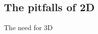 \begin{comment}
\subsubsection{Proximity Protocol}\label{sec:proximity2D}
We describe a protocol for ``proximity'' of a purported codeword to the
interleaved code. Let $U\in \FF^{n_2\times n_1}$ denote the purported codeword and let
$e< d/3$ denote the proximity parameter. 
\dnote{To Nitin: why did you not use the notation $\rsoracle$ for $U$? Is it that only those $U$s which satisfy the proximity test become $\rsoracle$?}
In its first message the
prover computes commitments $c_1,\ldots,c_n$ to the columns of $U$ and
sends it to verifier. Thereafter, the prover and the verifier interact as
follows:
\begin{enumerate}[{\rm 1.}]
\item $\prover\rightarrow \verifier$: Commitments $c_1,\ldots,c_n$ to the columns of $U$.
\item $\verifier\rightarrow \prover$: Verifier samples $\gamma \sample \FF^n$ and sends to the prover.
\item $\prover\rightarrow \verifier$: The prover computes $w=\gamma^T U$ and sends it to the verifier. 
\item $\verifier\rightarrow \prover$: Verifier sends $t$ randomly sampled indexes $\{j_u\}_{u\in [t]}$ from $[n]$ to the prover.
\item $\prover\leftrightarrow\verifier$: The prover has to now prove to the verifier that $w_{j_u} = \gamma^T U[\cdot, j_u]$, for all $u \in [t]$. The prover and the verifier will run the inner-product argument to check $\innp{\gamma}{U[\cdot, j_u]} = w_{j_u}$ for all $u \in [t]$. The verifier proceeds if the checks succeed.
\item The verifier also checks if  $w\in L$ and accepts if it succeeds.
\end{enumerate}
\end{comment}
\subsection{The pitfalls of 2D}
The need for 3D
